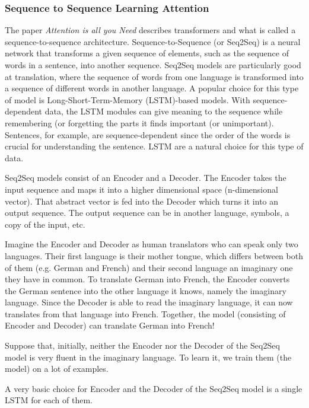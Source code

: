 \subsubsection{Sequence to Sequence Learning Attention}
The paper \textit{Attention is all you Need} describes transformers and what is called
a sequence-to-sequence architecture. Sequence-to-Sequence (or Seq2Seq) is a
neural network that transforms a given sequence of elements, such as the sequence
of words in a sentence, into another sequence. Seq2Seq models are particularly good
at translation, where the sequence of words from one language is transformed
into a sequence of different words in another language. A popular choice for this
type of model is Long-Short-Term-Memory (LSTM)-based models. With sequence-dependent
data, the LSTM modules can give meaning to the sequence while remembering (or
forgetting the parts it finds important (or unimportant). Sentences, for example,
are sequence-dependent since the order of the words is crucial for understanding
the sentence. LSTM are a natural choice for this type of data.
\newline

Seq2Seq models consist of an Encoder and a Decoder. The Encoder takes the input sequence
and maps it into a higher dimensional space (n-dimensional vector). That
abstract vector is fed into the Decoder which turns it into an output sequence. The
output sequence can be in another language, symbols, a copy of the input, etc.
\newline

Imagine the Encoder and Decoder as human translators who can speak only two
languages. Their first language is their mother tongue, which differs between
both of them (e.g. German and French) and their second language an imaginary one
they have in common. To translate German into French, the Encoder converts the German
sentence into the other language it knows, namely the imaginary language. Since the
Decoder is able to read the imaginary language, it can now translates from that
language into French. Together, the model (consisting of Encoder and Decoder)
can translate German into French!
\newline

Suppose that, initially, neither the Encoder nor the Decoder of the Seq2Seq
model is very fluent in the imaginary language. To learn it, we train them (the model)
on a lot of examples.
\newline

A very basic choice for Encoder and the Decoder of the Seq2Seq model is a single
LSTM for each of them.
\newline

